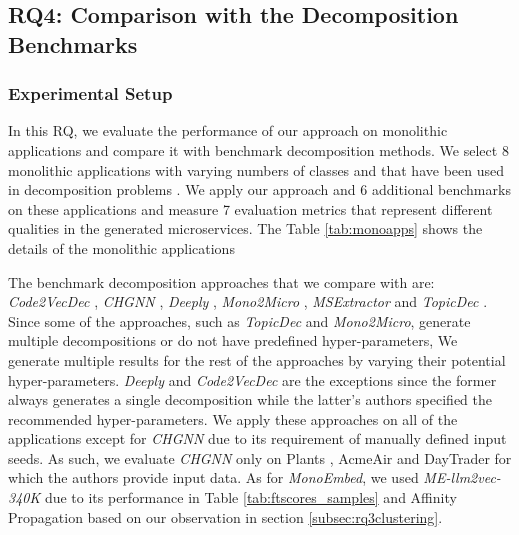 \subsection{RQ4: Comparison with the Decomposition Benchmarks}\label{subsec:benchmarks}
\subsubsection{Experimental Setup}
In this RQ, we evaluate the performance of our approach on monolithic applications and compare it with benchmark decomposition methods. We select 8 monolithic applications with varying numbers of classes and that have been used in decomposition problems \cite{khaled2022msextractor,kalia2021mono2micro,jin2021fosci}. We apply our approach and 6 additional benchmarks on these applications and measure 7 evaluation metrics that represent different qualities in the generated microservices. The Table \ref{tab:monoapps} shows the details of the monolithic applications

The benchmark decomposition approaches that we compare with are: \textit{Code2VecDec} \cite{aldebagy2021code2vec}, \textit{CHGNN} \cite{mathai2022chgnn}, \textit{Deeply} \cite{yedida2023deeply}, \textit{Mono2Micro} \cite{kalia2021mono2micro}, \textit{MSExtractor} \cite{khaled2022msextractor} and \textit{TopicDec} \cite{brito2021topicmodeling}. Since some of the approaches, such as \textit{TopicDec} and \textit{Mono2Micro}, generate multiple decompositions or do not have predefined hyper-parameters, We generate multiple results for the rest of the approaches by varying their potential hyper-parameters. \textit{Deeply} and \textit{Code2VecDec} are the exceptions since the former always generates a single decomposition while the latter’s authors specified the recommended hyper-parameters.  We apply these approaches on all of the applications except for \textit{CHGNN} due to its requirement of manually defined input seeds. As such, we evaluate \textit{CHGNN} only on Plants \cite{monoapps2024plants}, AcmeAir \cite{monoapps2024acmeair} and DayTrader \cite{monoapps2024daytrader} for which the authors provide input data. As for \textit{MonoEmbed}, we used \textit{ME-llm2vec-340K} due to its performance in Table \ref{tab:ftscores_samples} and Affinity Propagation based on our observation in section \ref{subsec:rq3clustering}.

